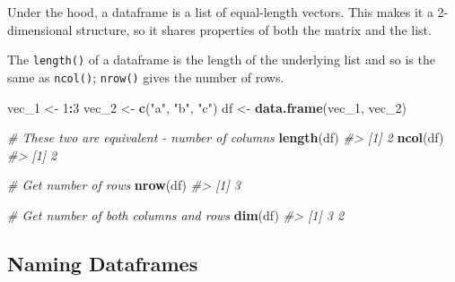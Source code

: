 \documentclass[]{book}
\newenvironment{Shaded}{\begin{snugshade}}{\end{snugshade}}
\newcommand{\KeywordTok}[1]{\textcolor[rgb]{0.13,0.29,0.53}{\textbf{#1}}}
\newcommand{\DecValTok}[1]{\textcolor[rgb]{0.00,0.00,0.81}{#1}}
\newcommand{\StringTok}[1]{\textcolor[rgb]{0.31,0.60,0.02}{#1}}
\newcommand{\CommentTok}[1]{\textcolor[rgb]{0.56,0.35,0.01}{\textit{#1}}}
\newcommand{\OperatorTok}[1]{\textcolor[rgb]{0.81,0.36,0.00}{\textbf{#1}}}
\newcommand{\NormalTok}[1]{#1}
\begin{document}
Under the hood, a dataframe is a list of equal-length vectors. This
makes it a 2-dimensional structure, so it shares properties of both the
matrix and the list.

\begin{Shaded}
\end{Shaded}

The \texttt{length()} of a dataframe is the length of the underlying
list and so is the same as \texttt{ncol()}; \texttt{nrow()} gives the
number of rows.

\begin{Shaded}
\begin{Highlighting}[]
\NormalTok{vec_}\DecValTok{1}\NormalTok{ <-}\StringTok{ }\DecValTok{1}\OperatorTok{:}\DecValTok{3}
\NormalTok{vec_}\DecValTok{2}\NormalTok{ <-}\StringTok{ }\KeywordTok{c}\NormalTok{(}\StringTok{"a"}\NormalTok{, }\StringTok{"b"}\NormalTok{, }\StringTok{"c"}\NormalTok{)}
\NormalTok{df <-}\StringTok{ }\KeywordTok{data.frame}\NormalTok{(vec_}\DecValTok{1}\NormalTok{, vec_}\DecValTok{2}\NormalTok{)}

\CommentTok{# These two are equivalent - number of columns}
\KeywordTok{length}\NormalTok{(df)}
\CommentTok{#> [1] 2}
\KeywordTok{ncol}\NormalTok{(df)}
\CommentTok{#> [1] 2}

\CommentTok{# Get number of rows}
\KeywordTok{nrow}\NormalTok{(df)}
\CommentTok{#> [1] 3}

\CommentTok{# Get number of both columns and rows}
\KeywordTok{dim}\NormalTok{(df)}
\CommentTok{#> [1] 3 2}
\end{Highlighting}
\end{Shaded}

\subsection{Naming Dataframes}\label{naming-dataframes}
\end{document}
